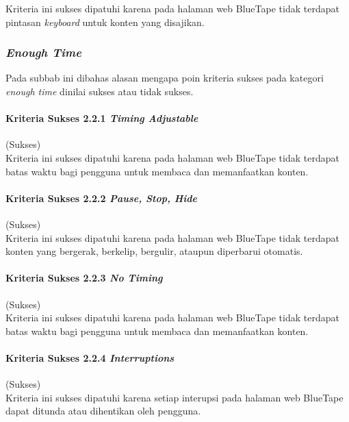 Kriteria ini sukses dipatuhi karena pada halaman web BlueTape tidak terdapat pintasan \textit{keyboard} untuk konten yang disajikan.

\subsubsection{\textit{Enough Time}}
\label{subsubsec:kepatuhan_bluetape_enough_time}
Pada subbab ini dibahas alasan mengapa poin kriteria sukses pada kategori \textit{enough time} dinilai sukses atau tidak sukses.

\paragraph{Kriteria Sukses 2.2.1 \textit{Timing Adjustable}}
\label{par:kepatuhan_bluetape_kriteria_sukses_2.2.1}
(Sukses)\\

Kriteria ini sukses dipatuhi karena pada halaman web BlueTape tidak terdapat batas waktu bagi pengguna untuk membaca dan memanfaatkan konten.

\paragraph{Kriteria Sukses 2.2.2 \textit{Pause, Stop, Hide}}
\label{par:kepatuhan_bluetape_kriteria_sukses_2.2.2}
(Sukses)\\

Kriteria ini sukses dipatuhi karena pada halaman web BlueTape tidak terdapat konten yang bergerak, berkelip, bergulir, ataupun diperbarui otomatis.

\paragraph{Kriteria Sukses 2.2.3 \textit{No Timing}}
\label{par:kepatuhan_bluetape_kriteria_sukses_2.2.3}
(Sukses)\\

Kriteria ini sukses dipatuhi karena pada halaman web BlueTape tidak terdapat batas waktu bagi pengguna untuk membaca dan memanfaatkan konten.

\paragraph{Kriteria Sukses 2.2.4 \textit{Interruptions}}
\label{par:kepatuhan_bluetape_kriteria_sukses_2.2.4}
(Sukses)\\

Kriteria ini sukses dipatuhi karena setiap interupsi pada halaman web BlueTape dapat ditunda atau dihentikan oleh pengguna.

